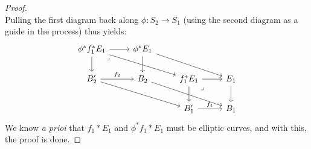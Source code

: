 \begin{proof}
$$                                $$
                            Pulling the first diagram back along $\phi: S_2 \to S_1$ (using the second diagram as a guide in the process) thus yields:
                                $$
                                    \begin{tikzcd}
                                    	{\phi^* f_1^* E_1} & {\phi^*E_1} \\
                                    	{B_2'} & {B_2} & {f_1^* E_1} & {E_1} \\
                                    	&& {B'_1} & {B_1}
                                    	\arrow[from=2-1, to=3-3]
                                    	\arrow["{f_2}", from=2-1, to=2-2]
                                    	\arrow["{f_1}", from=3-3, to=3-4]
                                    	\arrow[from=2-2, to=3-4]
                                    	\arrow[from=2-4, to=3-4]
                                    	\arrow[from=1-2, to=2-2]
                                    	\arrow[from=1-2, to=2-4]
                                    	\arrow[from=2-3, to=2-4]
                                    	\arrow[from=2-3, to=3-3]
                                    	\arrow[from=1-1, to=2-1]
                                    	\arrow[from=1-1, to=1-2]
                                    	\arrow[from=1-1, to=2-3]
                                    	\arrow["\lrcorner"{anchor=center, pos=0.125}, draw=none, from=2-3, to=3-4]
                                    	\arrow["\lrcorner"{anchor=center, pos=0.125}, draw=none, from=1-1, to=2-2]
                                    \end{tikzcd}
                                $$
                            We know \textit{a prioi} that $f_1* E_1$ and $\phi^* f_1* E_1$ must be elliptic curves, and with this, the proof is done.
                        \end{proof}
                    

